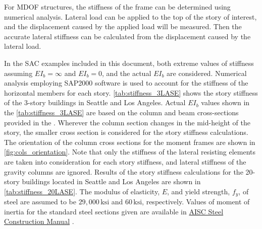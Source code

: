 \documentclass{simcenterdocumentation}
\newcommand{\ksi}{\ensuremath{\,\mathrm{ksi}}}
\begin{document}
For MDOF structures, the stiffness of the frame can be determined using numerical analysis. Lateral load can be applied to the top of the story of interest, and the displacement caused by the applied load will be measured. Then the accurate lateral stiffness can be calculated from the displacement caused by the lateral load. 

In the SAC examples included in this document, both extreme values of stiffness assuming $EI_b = \infty$ and $EI_b = 0$, and the actual $EI_b$ are considered. Numerical analysis employing SAP2000 \cite{sap2000} software is used to account for the stiffness of the horizontal members for each story. \cref{tab:stiffness_3LASE} shows the story stiffness of the 3-story buildings in Seattle and Los Angeles. Actual $EI_b$ values shown in the \cref{tab:stiffness_3LASE} are based on the column and beam cross-sections provided in the \cite{FEMA335c2000}. Wherever the column section changes in the mid-height of the story, the smaller cross section is considered for the story stiffness calculations. The orientation of the column cross sections for the moment frames are shown in \cref{fig:cols_orientation}. Note that only the stiffness of the lateral resisting elements are taken into consideration for each story stiffness, and lateral stiffness of the gravity columns are ignored. Results of the story stiffness calculations for the 20-story buildings located in Seattle and Los Angeles are shown in \cref{tab:stiffness_20LASE}. The modulus of elasticity, $E$, and yield strength, $f_y$, of steel are assumed to be $29,000 \ksi$ and $60 \ksi$, respectively. Values of moment of inertia for the standard steel sections given are available in \href{https://www.aisc.org/publications/steel-construction-manual-resources/}{AISC Steel Construction Manual} \cite{aiscManual}.
\end{document}
